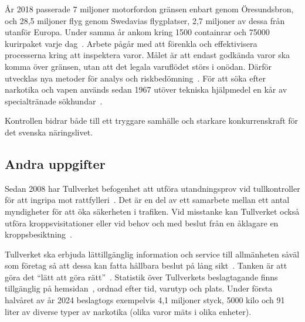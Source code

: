År 2018 passerade 7 miljoner motorfordon gränsen enbart genom Öresundsbron,
och 28,5 miljoner flyg genom Swedavias flygplatser, 2,7 miljoner av dessa från
utanför Europa. Under samma år ankom kring 1500 containrar och 75000
kurirpaket varje dag~\cite{granskning2019}.
%
Arbete pågår med att förenkla och effektivisera processerna kring att
inspektera varor. Målet är att endast godkända varor ska komma över gränsen,
utan att det legala varuflödet störs i onödan. Därför utvecklas nya metoder
för analys och riskbedömning~\cite{vision}.
%
För att söka efter narkotika och vapen används sedan 1967 utöver tekniska
hjälpmedel en kår av specialtränade sökhundar~\cite{sokhundar}.

Kontrollen bidrar både till ett tryggare samhälle och starkare konkurrenskraft
för det svenska näringslivet.

\subsection{Andra uppgifter}

Sedan 2008 har Tullverket befogenhet att utföra utandningsprov vid
tullkontroller för att ingripa mot rattfylleri~\cite{rattfylleri}. Det är en
del av ett samarbete mellan ett antal myndigheter för att öka säkerheten
i trafiken.
%
Vid misstanke kan Tullverket också utföra kroppsvisitationer eller vid behov
och med beslut från en åklagare en kroppsbesiktning~\cite{visitation}.

Tullverket ska erbjuda lättillgänglig information och service till
allmänheten såväl som företag så att dessa kan fatta hållbara beslut på
lång sikt~\cite{forordning}. Tanken är att göra det
``lätt att göra rätt''~\cite{vision}.
%
Statistik över Tullverkets beslagtagande finns tillgänglig på
hemsidan~\cite{statistik}, ordnad efter tid, varutyp och plats. Under första
halvåret av år 2024 beslagtogs exempelvis 4,1 miljoner styck, 5000 kilo och 91
liter av diverse typer av narkotika (olika varor mäts i olika enheter).
